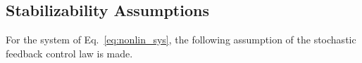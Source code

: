 \documentclass[letterpaper, 10pt, conference]{ieeeconf}
\begin{document}
	\subsection{Stabilizability Assumptions}
	For the system of Eq.~\ref{eq:nonlin_sys}, the following assumption of the stochastic feedback control law is made.
\end{document}
